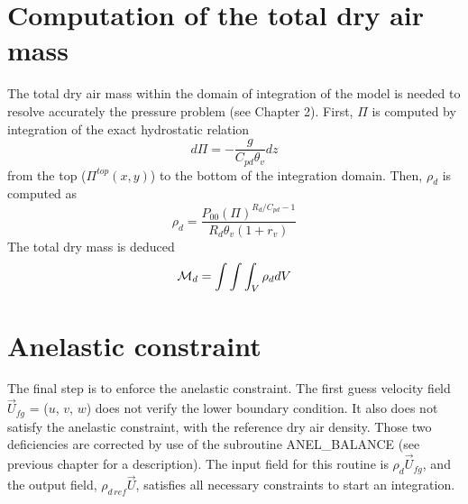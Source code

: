 \section{Computation of the total dry air mass}
The total dry air mass within the domain of integration of the model
is needed to resolve accurately the pressure problem (see Chapter 2).
First, $\Pi$ is computed by integration of the exact hydrostatic relation
\begin{equation}
d\Pi=-\frac{g}{C_{pd}\theta_v}dz
\end{equation}
from the top ($\Pi^{top}(x,y)$) to the bottom of the integration domain.
Then, $\rho_d$ is computed as
\begin{equation}
\label{eq:rhodd}
{\rho_d}=\frac{P_{00}(\Pi)^{R_d/C_{pd}-1}}
{R_d\theta_v(1+r_v)}
\end{equation}
The total dry mass is deduced
\begin{equation}
{\cal{M}}_d=\int\int\int_V\rho_ddV
\end{equation}

\section{Anelastic constraint}

The final step is to enforce the anelastic constraint.
The first guess velocity field $\vec{U}_{fg}$ = ($u$, $v$, $w$) does not verify the lower
boundary condition. It also does not satisfy the anelastic
constraint, with the reference dry air density. Those two deficiencies are
corrected by use of the subroutine ANEL\_BALANCE (see previous
chapter for a description). The input field for this routine is
$\rho_d \vec{U}_{fg}$, and the output field, $\rho_{d\,ref} \vec{U}$,
satisfies all necessary constraints to start an integration.


%
%
